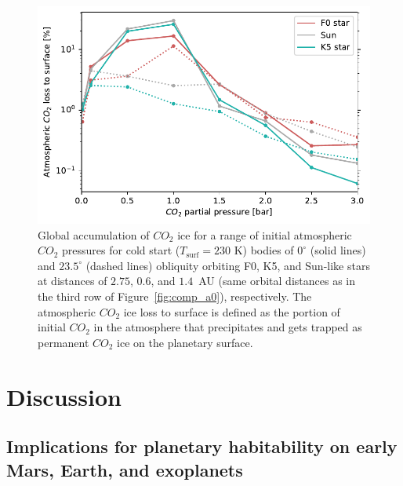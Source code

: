 \documentclass[fleqn,usenatbib]{mnras}
\begin{document}
\begin{figure}
	\includegraphics[width=\columnwidth]{Figures/CO2_ice.pdf}
    \caption{Global accumulation of $CO_{\mathrm{2}}$ ice for a range of initial atmospheric $CO_{\mathrm{2}}$ pressures for cold start ($T_{\mathrm{surf}}=230$ K) bodies of $0^{\circ}$ (solid lines) and $23.5^{\circ}$ (dashed lines) obliquity orbiting F0, K5, and Sun-like stars at distances of $2.75$, $0.6$, and $1.4$~AU (same orbital distances as in the third row of Figure~\ref{fig:comp_a0}), respectively. The atmospheric $CO_{\mathrm{2}}$ ice loss to surface is defined as the portion of initial $CO_{\mathrm{2}}$ in the atmosphere that precipitates and gets trapped as permanent $CO_{\mathrm{2}}$ ice on the planetary surface.} %
    
    \label{fig:CO2_ice}
\end{figure}

\section{Discussion}

\subsection{Implications for planetary habitability on early Mars, Earth, and exoplanets}
\end{document}

